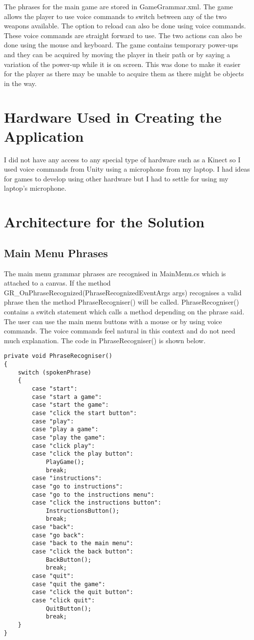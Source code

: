 \documentclass{article}
\begin{document}
The phrases for the main game are stored in GameGrammar.xml. The game allows the player to use voice commands to switch between any of the two weapons available. The option to reload can also be done using voice commands. These voice commands are straight forward to use. The two actions can also be done using the mouse and keyboard. The game contains temporary power-ups and they can be acquired by moving the player in their path or by saying a variation of the power-up while it is on screen. This was done to make it easier for the player as there may be unable to acquire them as there might be objects in the way.

\section{Hardware Used in Creating the Application}
I did not have any access to any special type of hardware such as a Kinect so I used voice commands from Unity using a microphone from my laptop. I had ideas for games to develop using other hardware but I had to settle for using my laptop's microphone.

\section{Architecture for the Solution}
\subsection{Main Menu Phrases}
The main menu grammar phrases are recognised in MainMenu.cs which is attached to a canvas. If the method GR\_OnPhraseRecognized(PhraseRecognizedEventArgs args) recognises a valid phrase then the method PhraseRecogniser() will be called. PhraseRecogniser() contains a switch statement which calls a method depending on the phrase said. The user can use the main menu buttons with a mouse or by using voice commands. The voice commands feel natural in this context and do not need much explanation. The code in PhraseRecogniser() is shown below.
\begin{verbatim}
private void PhraseRecogniser()
{
    switch (spokenPhrase)
    {
        case "start":
        case "start a game":
        case "start the game":
        case "click the start button":
        case "play":
        case "play a game":
        case "play the game":
        case "click play":
        case "click the play button":
            PlayGame();
            break;
        case "instructions":
        case "go to instructions":
        case "go to the instructions menu":
        case "click the instructions button":
            InstructionsButton();
            break;
        case "back":
        case "go back":
        case "back to the main menu":
        case "click the back button":
            BackButton();
            break;
        case "quit":
        case "quit the game":
        case "click the quit button":
        case "click quit":
            QuitButton();
            break;
    }
}
\end{verbatim}
\end{document}
